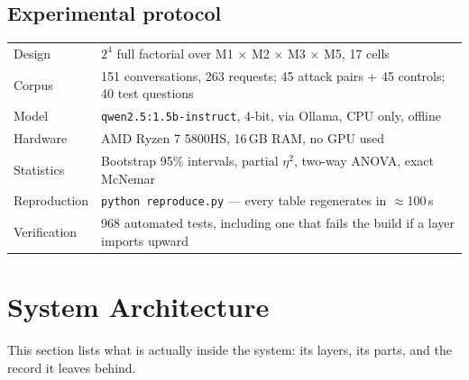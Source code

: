 \documentclass[11pt,a4paper]{article}
\begin{document}
\subsection{Experimental protocol}
\begin{tabularx}{\textwidth}{@{}l X@{}}
\toprule
Design & $2^4$ full factorial over M1 $\times$ M2 $\times$ M3 $\times$ M5, 17 cells \\
Corpus & 151 conversations, 263 requests; 45 attack pairs + 45 controls; 40 test questions \\
Model & \texttt{qwen2.5:1.5b-instruct}, 4-bit, via Ollama, CPU only, offline \\
Hardware & AMD Ryzen 7 5800HS, 16\,GB RAM, no GPU used \\
Statistics & Bootstrap 95\% intervals, partial $\eta^2$, two-way ANOVA, exact McNemar \\
Reproduction & \texttt{python reproduce.py} --- every table regenerates in $\approx$100\,s \\
Verification & 968 automated tests, including one that fails the build if a layer imports upward \\
\bottomrule
\end{tabularx}

\newpage
\section{System Architecture}

This section lists what is actually inside the system: its layers, its parts, and the
record it leaves behind.
\end{document}
